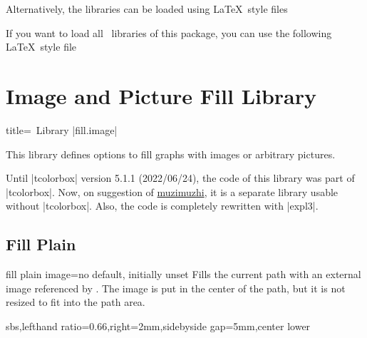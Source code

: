 \documentclass[a4paper,11pt]{article}
\begin{document}
Alternatively, the libraries can be loaded using \LaTeX\ style files
\begin{dispListing*}{}
\usepackage{tikzfill.***} %
\end{dispListing*}

If you want to load all \tikzname\ libraries of this package, you can use
the following \LaTeX\ style file
\begin{dispListing*}{}
\usepackage{tikzfill} %
\end{dispListing*}



\clearpage
\section{Image and Picture Fill Library}\label{sec:imagefill}%

\begin{dispListing*}{title=\tikzname\ Library |fill.image|}
\usetikzlibrary{fill.image} %
\usepackage{tikzfill.image} %
\end{dispListing*}

This library defines options to fill graphs with images or arbitrary pictures.

Until |tcolorbox| version 5.1.1 (2022/06/24), the code of this library was part
of |tcolorbox|. Now, on suggestion of
\href{https://github.com/muzimuzhi}{muzimuzhi},
it is a separate library usable without |tcolorbox|. Also, the code is
completely rewritten with |expl3|.



\subsection{Fill Plain}
\begin{docTikzKey}{fill plain image}{=}{no default, initially unset}
  Fills the current path with an external image referenced by .
  The image is put in the center of the path, but it is not resized to fit into
  the path area.
\begin{dispExample*}{sbs,lefthand ratio=0.66,right=2mm,sidebyside gap=5mm,center lower}
\end{dispExample*}
\end{docTikzKey}
\end{document}
